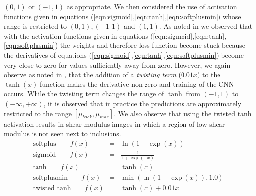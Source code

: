 \documentclass[12pt]{article}
\newcommand{\ber}{\begin{eqnarray}}
\newcommand{\eer}{\end{eqnarray}}
\begin{document}
$(0,1)$ or $(-1,1)$ as appropriate. We then considered the use of activation functions given in equations (\ref{eqn:sigmoid},\ref{eqn:tanh},\ref{eqn:softplusmin}) whose range is restricted to $(0,1),(-1,1)$ and $(0,1)$. As noted in \cite{bookchap:lecun98b} we observed that with the activation functions given in equations (\ref{eqn:sigmoid},\ref{eqn:tanh},\ref{eqn:softplusmin}) the weights and therefore loss function become stuck because the derivatives of equations (\ref{eqn:sigmoid},\ref{eqn:tanh},\ref{eqn:softplusmin}) become very close to zero for values sufficiently away from zero. However, we again observe as noted in \cite{bookchap:lecun98b}, that the addition of a \textit{twisting term} ($0.01x$) to the $\tanh(x)$ function makes the derivative non-zero and training of the CNN occurs. While the twisting term changes the range of $\tanh$ from $(-1,1)$ to $(-\infty,+\infty)$, it is observed that in practice the predictions are approximately restricted to the range $[\mu_{back},\mu_{max}]$. We also observe that using the twisted tanh activation results in shear modulus images in which a region of low shear modulus is not seen next to inclusions.
\begin{subequations}
\ber
\text{softplus}\qquad f(x) &=& \ln(1+\exp(x)) \label{eqn:softplus}\\
\text{sigmoid}\qquad f(x) &=& \frac{1}{1+\exp(-x)}\label{eqn:sigmoid}\\
\text{tanh} \qquad f(x) &=& \tanh(x) \label{eqn:tanh}\\
\text{softplusmin} \qquad f(x) &=& \min(\ln(1+\exp(x)),1.0)\label{eqn:softplusmin} \\
\text{twisted tanh} \qquad f(x) &=& \tanh(x) + 0.01x  \label{eqn:twisttanh}
\eer
\end{subequations}
%
\end{document}
